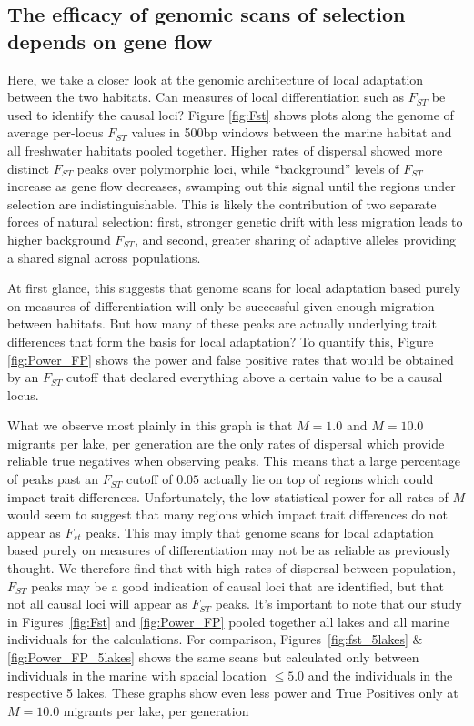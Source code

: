 \documentclass{article}
\newcommand{\wac}[1]{\todo[linecolor=green,backgroundcolor=yellow!25,bordercolor=black]{#1}}
\begin{document}
\subsection*{The efficacy of genomic scans of selection depends on gene flow}
\wac{just made a suggested change}

Here, we take a closer look at the genomic architecture of local adaptation between the two habitats. 
Can measures of local differentiation such as $F_{ST}$ be used to identify the causal loci? Figure \ref{fig:Fst} shows plots along the genome of average per-locus $F_{ST}$ values in 500bp windows between the marine habitat and all freshwater habitats pooled together. 
Higher rates of dispersal showed more distinct $F_{ST}$ peaks over polymorphic loci, while ``background'' levels of $F_{ST}$ increase as gene flow decreases, swamping out this signal until the regions under selection are indistinguishable. This is likely the contribution of two separate forces of natural selection: 
first, stronger genetic drift with less migration leads to higher background $F_{ST}$, and second, greater sharing of adaptive alleles providing a shared signal across populations.

At first glance, this suggests that genome scans for local adaptation based purely on measures of differentiation will only be successful given enough migration between habitats. 
But how many of these peaks are actually underlying trait differences that form the basis for local adaptation? 
To quantify this, Figure \ref{fig:Power_FP} shows the power and false positive rates that would be obtained by an $F_{ST}$ cutoff that declared everything above a certain value to be a causal locus. 

What we observe most plainly in this graph is that $M = 1.0$ and $M = 10.0$ migrants per lake, per generation are the only rates of dispersal which provide reliable true negatives when observing peaks. 
This means that a large percentage of peaks past an $F_{ST}$ cutoff of $0.05$ actually lie on top of regions which could impact trait differences.
Unfortunately, the low statistical power for all rates of $M$ would seem to suggest that many regions which impact trait differences do not appear as $F_{st}$ peaks. 
This may imply that genome scans for local adaptation based purely on measures of differentiation may not be as reliable as previously thought. We therefore find that with high rates of dispersal between population, $F_{ST}$ peaks may be a good indication of causal loci that are identified, but that not all causal loci will appear as $F_{ST}$ peaks.
It's important to note that our study in Figures~\ref{fig:Fst} and \ref{fig:Power_FP} pooled together all lakes and all marine individuals for the calculations. 
For comparison, Figures~\ref{fig:fst_5lakes} \& \ref{fig:Power_FP_5lakes} shows the same scans but calculated only between individuals in the marine with spacial location $\le 5.0$ and the individuals in the respective 5 lakes. 
These graphs show even less power and True Positives only at $ M = 10.0$ migrants per lake, per generation
\end{document}
